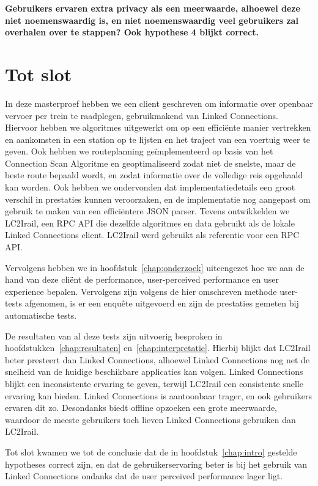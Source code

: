 	\textbf{Gebruikers ervaren extra privacy als een meerwaarde, alhoewel deze niet noemenswaardig is, en niet noemenswaardig veel gebruikers zal overhalen over te stappen? Ook hypothese 4 blijkt correct.}

\section{Tot slot}
	
	In deze masterproef hebben we een client geschreven om informatie over openbaar vervoer per trein te raadplegen, gebruikmakend van Linked Connections. Hiervoor hebben we algoritmes uitgewerkt om op een efficiënte manier vertrekken en aankomsten in een station op te lijsten en het traject van een voertuig weer te geven. Ook hebben we routeplanning geïmplementeerd op basis van het Connection Scan Algoritme en geoptimaliseerd zodat niet de snelste, maar de beste route bepaald wordt, en zodat informatie over de volledige reis opgehaald kan worden. Ook hebben we ondervonden dat implementatiedetails een groot verschil in prestaties kunnen veroorzaken, en de implementatie nog aangepast om gebruik te maken van een efficiëntere JSON parser. Tevens ontwikkelden we LC2Irail, een RPC API die dezelfde algoritmes en data gebruikt als de lokale Linked Connections client. LC2Irail werd gebruikt als referentie voor een RPC API.
	
	Vervolgens hebben we in hoofdstuk~\ref{chap:onderzoek} uiteengezet hoe we aan de hand van deze cliënt de performance, user-perceived performance en user experience bepalen. Vervolgens zijn volgens de hier omschreven methode user-tests afgenomen, is er een enquête uitgevoerd en zijn de prestaties gemeten bij automatische tests. 
	
	De resultaten van al deze tests zijn uitvoerig besproken in hoofdstukken~\ref{chap:resultaten} en~\ref{chap:interpretatie}. Hierbij blijkt dat LC2Irail beter presteert dan Linked Connections, alhoewel Linked Connections nog net de snelheid van de huidige beschikbare applicaties kan volgen. Linked Connections blijkt een inconsistente ervaring te geven, terwijl LC2Irail een consistente snelle ervaring kan bieden. Linked Connections is aantoonbaar trager, en ook gebruikers ervaren dit zo. Desondanks biedt offline opzoeken een grote meerwaarde, waardoor de meeste gebruikers toch lieven Linked Connections gebruiken dan LC2Irail.
	
	Tot slot kwamen we tot de conclusie dat de in hoofdstuk~\ref{chap:intro} gestelde hypotheses correct zijn, en dat de gebruikerservaring beter is bij het gebruik van Linked Connections ondanks dat de user perceived performance lager ligt.